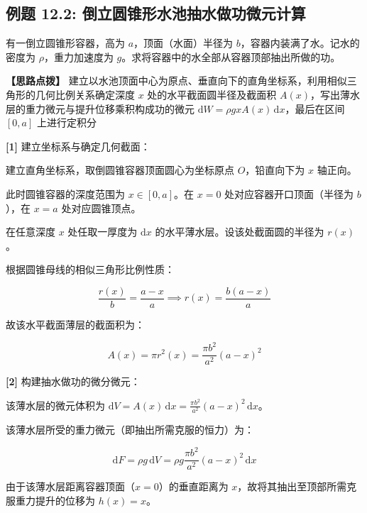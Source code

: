 \documentclass[11pt,a4paper,UTF8]{ctexart}
\begin{document}
\subsection{例题 12.2: 倒立圆锥形水池抽水做功微元计算}

有一倒立圆锥形容器，高为 $a$，顶面（水面）半径为 $b$，容器内装满了水。记水的密度为 $\rho$，重力加速度为 $g$。求将容器中的水全部从容器顶部抽出所做的功。

\textbf{\color{DeepPurple}【思路点拨】} 建立以水池顶面中心为原点、垂直向下的直角坐标系，利用相似三角形的几何比例关系确定深度 $x$ 处的水平截面圆半径及截面积 $A(x)$，写出薄水层的重力微元与提升位移乘积构成功的微元 $\mathrm{d}W = \rho g x A(x)\,\mathrm{d}x$，最后在区间 $[0, a]$ 上进行定积分


\begin{solbox}[分步推导与答题规范]
\textbf{[1]} 建立坐标系与确定几何截面：

建立直角坐标系，取倒圆锥容器顶面圆心为坐标原点 $O$，铅直向下为 $x$ 轴正向。

此时圆锥容器的深度范围为 $x \in [0, a]$。在 $x = 0$ 处对应容器开口顶面（半径为 $b$），在 $x = a$ 处对应圆锥顶点。

在任意深度 $x$ 处任取一厚度为 $\mathrm{d}x$ 的水平薄水层。设该处截面圆的半径为 $r(x)$。

根据圆锥母线的相似三角形比例性质：


\begin{equation*}
\frac{r(x)}{b} = \frac{a - x}{a} \implies r(x) = \frac{b(a - x)}{a}
\end{equation*}


故该水平截面薄层的截面积为：


\begin{equation*}
A(x) = \pi r^2(x) = \frac{\pi b^2}{a^2}(a - x)^2
\end{equation*}


\textbf{[2]} 构建抽水做功的微分微元：

该薄水层的微元体积为 $\mathrm{d}V = A(x)\,\mathrm{d}x = \frac{\pi b^2}{a^2}(a - x)^2\,\mathrm{d}x$。

该薄水层所受的重力微元（即抽出所需克服的恒力）为：


\begin{equation*}
\mathrm{d}F = \rho g\,\mathrm{d}V = \rho g \frac{\pi b^2}{a^2}(a - x)^2\,\mathrm{d}x
\end{equation*}


由于该薄水层距离容器顶面（$x = 0$）的垂直距离为 $x$，故将其抽出至顶部所需克服重力提升的位移为 $h(x) = x$。


\end{solbox}
\end{document}
